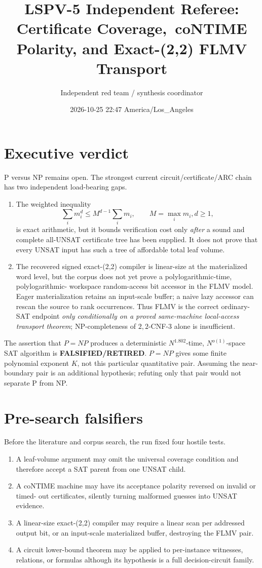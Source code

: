 \documentclass[11pt]{article}
\title{LSPV-5 Independent Referee: Certificate Coverage,\
coNTIME Polarity, and Exact-(2,2) FLMV Transport}
\author{Independent red team / synthesis coordinator}
\date{2026-10-25 22:47 America/Los\_Angeles}
\newcommand{\retired}{\textbf{FALSIFIED/RETIRED}}
\begin{document}
\maketitle

\section*{Executive verdict}
P versus NP remains open.  The strongest current circuit/certificate/ARC chain has two
independent load-bearing gaps.
\begin{enumerate}[leftmargin=*]
\item The weighted inequality
\[
  \sum_i m_i^d\le M^{d-1}\sum_i m_i,\qquad M=\max_i m_i, d\ge1,
\]
is exact arithmetic, but it bounds verification cost only \emph{after} a sound and
complete all-UNSAT certificate tree has been supplied.  It does not prove that every
UNSAT input has such a tree of affordable total leaf volume.
\item The recovered signed exact-(2,2) compiler is linear-size at the materialized
word level, but the corpus does not yet prove a polylogarithmic-time, polylogarithmic-
workspace random-access bit accessor in the FLMV model.  Eager materialization retains
an input-scale buffer; a naive lazy accessor can rescan the source to rank occurrences.
Thus FLMV is the correct ordinary-SAT endpoint \emph{only conditionally on a proved
same-machine local-access transport theorem}; NP-completeness of $2,2$-CNF-3 alone is
insufficient.
\end{enumerate}

The assertion that $P=NP$ produces a deterministic $N^{1.802}$-time,
$N^{o(1)}$-space SAT algorithm is \retired.  $P=NP$ gives some finite polynomial
exponent $K$, not this particular quantitative pair.  Assuming the near-boundary pair
is an additional hypothesis; refuting only that pair would not separate P from NP.

\section*{Pre-search falsifiers}
Before the literature and corpus search, the run fixed four hostile tests.
\begin{enumerate}[leftmargin=*]
\item A leaf-volume argument may omit the universal coverage condition and therefore
accept a SAT parent from one UNSAT child.
\item A coNTIME machine may have its acceptance polarity reversed on invalid or timed-
out certificates, silently turning malformed guesses into UNSAT evidence.
\item A linear-size exact-(2,2) compiler may require a linear scan per addressed output
bit, or an input-scale materialized buffer, destroying the FLMV pair.
\item A circuit lower-bound theorem may be applied to per-instance witnesses,
relations, or formulas although its hypothesis is a full decision-circuit family.
\end{enumerate}
\end{document}
